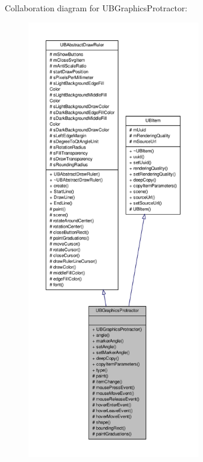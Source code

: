 Collaboration diagram for U\-B\-Graphics\-Protractor\-:
\nopagebreak
\begin{figure}[H]
\begin{center}
\leavevmode
\includegraphics[height=550pt]{d0/d36/class_u_b_graphics_protractor__coll__graph}
\end{center}
\end{figure}

